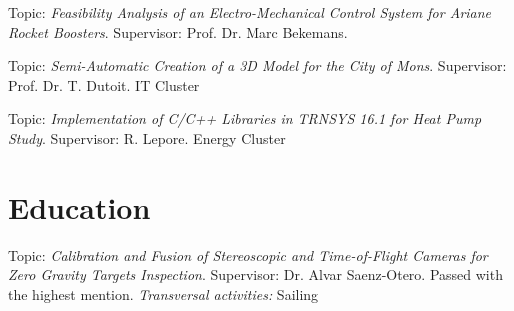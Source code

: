 \documentclass[a4paper]{deedy-resume} %
\begin{document}
\vspace{10pt}


Topic: \textit{Feasibility Analysis of an Electro-Mechanical Control System for Ariane Rocket Boosters}. Supervisor: Prof. Dr. Marc Bekemans.

\vspace{10pt}

Topic: \textit{Semi-Automatic Creation of a 3D Model for the City of Mons}. Supervisor: Prof. Dr. T. Dutoit. IT Cluster

\vspace{10pt}

Topic: \textit{Implementation of C/C++ Libraries in TRNSYS 16.1 for Heat Pump Study}. Supervisor: R. Lepore. Energy Cluster

\vspace{15pt}


\section{Education}
\vspace{5pt}

\vspace{2pt}
Topic: \textit{Calibration and Fusion of Stereoscopic and Time-of-Flight Cameras for Zero Gravity Targets Inspection}. Supervisor: Dr. Alvar Saenz-Otero. Passed with the highest mention.
\textit{Transversal activities:}  Sailing

\vspace{10pt}
\end{document}
